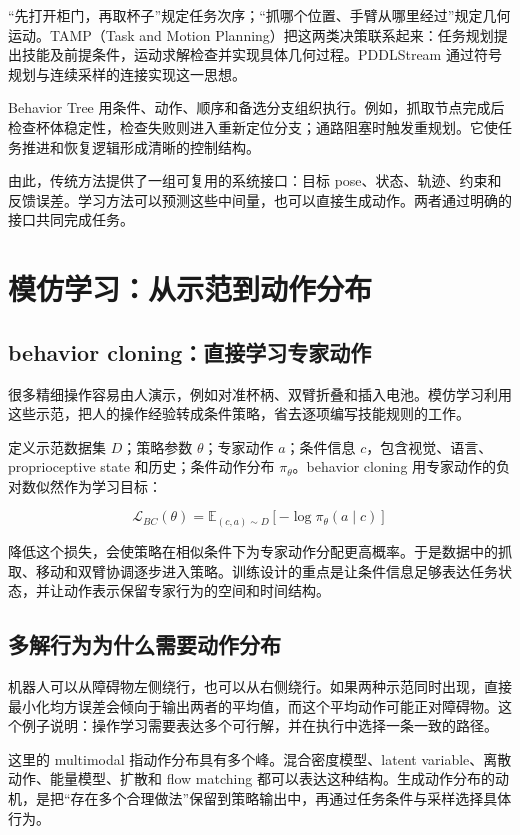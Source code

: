 \documentclass[UTF8,a4paper,11pt,oneside,openany,fontset=none]{ctexbook}
\begin{document}
``先打开柜门，再取杯子''规定任务次序；``抓哪个位置、手臂从哪里经过''规定几何运动。TAMP（Task and Motion Planning）把这两类决策联系起来：任务规划提出技能及前提条件，运动求解检查并实现具体几何过程。PDDLStream 通过符号规划与连续采样的连接实现这一思想。\cite{R01}

Behavior Tree 用条件、动作、顺序和备选分支组织执行。例如，抓取节点完成后检查杯体稳定性，检查失败则进入重新定位分支；通路阻塞时触发重规划。它使任务推进和恢复逻辑形成清晰的控制结构。

由此，传统方法提供了一组可复用的系统接口：目标 pose、状态、轨迹、约束和反馈误差。学习方法可以预测这些中间量，也可以直接生成动作。两者通过明确的接口共同完成任务。

\chapter{模仿学习：从示范到动作分布}

\section{behavior cloning：直接学习专家动作}\label{behavior-cloningux76f4ux63a5ux5b66ux4e60ux4e13ux5bb6ux52a8ux4f5c}

很多精细操作容易由人演示，例如对准杯柄、双臂折叠和插入电池。模仿学习利用这些示范，把人的操作经验转成条件策略，省去逐项编写技能规则的工作。

定义示范数据集 \(D\)；策略参数 \(\theta\)；专家动作 \(a\)；条件信息 \(c\)，包含视觉、语言、proprioceptive state 和历史；条件动作分布 \(\pi _{\theta }\)。behavior cloning 用专家动作的负对数似然作为学习目标：

\[
\mathcal L_{BC}(\theta)=\mathbb E_{(c,a)\sim D}\left[-\log\pi_\theta(a\mid c)\right]
\]

降低这个损失，会使策略在相似条件下为专家动作分配更高概率。于是数据中的抓取、移动和双臂协调逐步进入策略。训练设计的重点是让条件信息足够表达任务状态，并让动作表示保留专家行为的空间和时间结构。

\section{多解行为为什么需要动作分布}

机器人可以从障碍物左侧绕行，也可以从右侧绕行。如果两种示范同时出现，直接最小化均方误差会倾向于输出两者的平均值，而这个平均动作可能正对障碍物。这个例子说明：操作学习需要表达多个可行解，并在执行中选择一条一致的路径。

这里的 multimodal 指动作分布具有多个峰。混合密度模型、latent variable、离散动作、能量模型、扩散和 flow matching 都可以表达这种结构。生成动作分布的动机，是把``存在多个合理做法''保留到策略输出中，再通过任务条件与采样选择具体行为。
\end{document}
